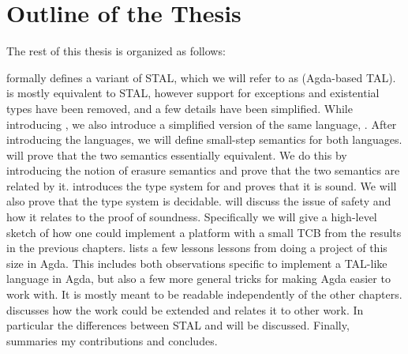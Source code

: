 \section{Outline of the Thesis}

The rest of this thesis is organized as follows:

\textbf{} formally defines a variant of STAL, which we will
refer to as \ATAL (Agda-based TAL). \ATAL is mostly equivalent to STAL, however
support for exceptions and existential types have been removed, and a few
details have been simplified. While introducing \ATAL, we also introduce a
simplified version of the same language, \ATALe. After introducing the
languages, we will define small-step semantics for both
languages. \textbf{} will prove that the two semantics
essentially equivalent. We do this by introducing the notion of erasure
semantics and prove that the two semantics are related by
it. \textbf{} introduces the type system for \ATAL and proves
that it is sound. We will also prove that the type system is
decidable. \textbf{} will discuss the issue of safety and
how it relates to the proof of soundness. Specifically we will give a high-level
sketch of how one could implement a platform with a small TCB from the results
in the previous chapters. \textbf{} lists a few lessons
lessons from doing a project of this size in Agda. This includes both
observations specific to implement a TAL-like language in Agda, but also a few
more general tricks for making Agda easier to work with. It is mostly meant to
be readable independently of the other chapters. \textbf{}
discusses how the work could be extended and relates it to other work. In
particular the differences between STAL and \ATAL will be discussed. Finally,
\textbf{} summaries my contributions and concludes.
